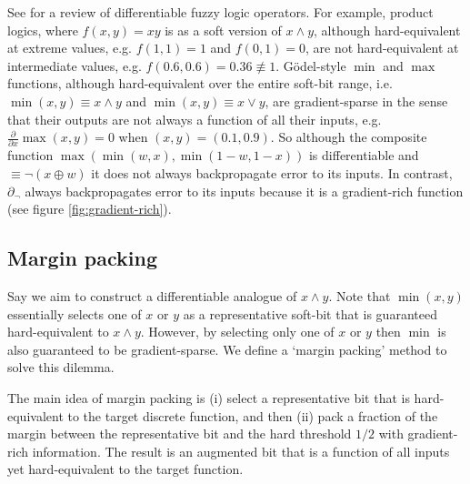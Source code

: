 \documentclass{article} %
\begin{document}
See \cite{VANKRIEKEN2022103602} for a review of differentiable fuzzy logic operators. For example, product logics, where $f(x,y) = x y$ is as a soft version of $x \wedge y$, although hard-equivalent at extreme values, e.g. $f(1,1)=1$ and $f(0,1)=0$, are not hard-equivalent at intermediate values, e.g. $f(0.6, 0.6) = 0.36 \not\equiv 1$. G\"{o}del-style $\operatorname{min}$ and $\operatorname{max}$ functions, although hard-equivalent over the entire soft-bit range, i.e. $\operatorname{min}(x,y) \equiv x \wedge y$ and $\operatorname{min}(x,y) \equiv x \vee y$, are gradient-sparse in the sense that their outputs are not always a function of all their inputs, e.g. $\frac{\partial}{\partial x} \operatorname{max}(x,y) = 0$ when $(x,y)=(0.1, 0.9)$. So although the composite function $\operatorname{max}(\operatorname{min}(w, x), \operatorname{min}(1-w, 1-x))$ is differentiable and $\equiv \neg(x \oplus w)$ it does not always backpropagate error to its inputs. In contrast, $\partial_{\neg}$ always backpropagates error to its inputs because it is a gradient-rich function (see figure \ref{fig:gradient-rich}). 

\subsection{Margin packing}

Say we aim to construct a differentiable analogue of $x \wedge y$. Note that $\operatorname{min}(x,y)$ essentially selects one of $x$ or $y$ as a representative soft-bit that is guaranteed hard-equivalent to $x \wedge y$. However, by selecting only one of $x$ or $y$ then $\operatorname{min}$ is also guaranteed to be gradient-sparse. We define a `margin packing' method to solve this dilemma.

The main idea of margin packing is (i) select a representative bit that is hard-equivalent to the target discrete function, and then (ii) pack a fraction of the margin between the representative bit and the hard threshold $1/2$ with gradient-rich information. The result is an augmented bit that is a function of all inputs yet hard-equivalent to the target function.
\end{document}
